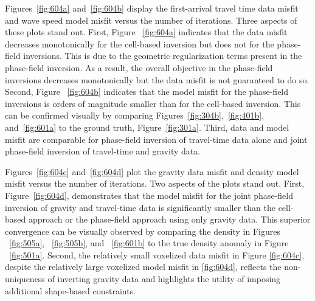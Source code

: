 \documentclass[manuscript,revised]{geophysics}
\begin{document}
Figures~\ref{fig:604a} and~\ref{fig:604b} display the first-arrival travel time data misfit and wave speed model misfit versus the number of iterations.  Three aspects of these plots stand out.  First, Figure ~\ref{fig:604a} indicates that the data misfit decreases monotonically for the cell-based inversion but does not for the phase-field inversions.  This is due to the geometric regularization terms present in the phase-field inversion.  As a result, the overall objective in the phase-field inversions decreases monotonically but the data misfit is not guaranteed to do so.   Second, Figure ~\ref{fig:604b} indicates that the model misfit for the phase-field inversions is orders of magnitude smaller than for the cell-based inversion. This can be confirmed visually by comparing Figures~\ref{fig:304b},~\ref{fig:401b}, and~\ref{fig:601a} to the ground truth, Figure~\ref{fig:301a}.  Third, data and model misfit are comparable for phase-field inversion of travel-time data alone and joint phase-field inversion of travel-time and gravity data.   

Figures~\ref{fig:604c} and~\ref{fig:604d} plot the gravity data misfit and density model misfit versus the number of iterations. Two aspects of the plots stand out.  First, Figure~\ref{fig:604d}, demonstrates that the model misfit for the joint phase-field inversion of gravity and travel-time data is significantly smaller than the cell-based approach or the phase-field approach using only gravity data. This superior convergence can be visually observed by comparing the density in Figures ~\ref{fig:505a}, ~\ref{fig:505b}, and ~\ref{fig:601b} to the true density anomaly in Figure ~\ref{fig:501a}. Second, the relatively small voxelized data misfit in Figure \ref{fig:604c}, despite the relatively large voxelized model misfit in \ref{fig:604d}, reflects the non-uniqueness of inverting gravity data and highlights the utility of imposing additional shape-based constraints.
\end{document}
